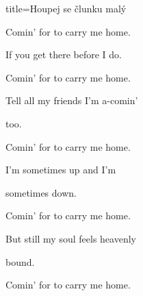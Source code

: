 \begin{song}{title=\predtitle\centering Houpej se člunku malý \\\large \vspace*{-0.3cm}}
\begin{centerjustified}
\begin{varwidth}[t]{0.48\textwidth}
Comin' for to carry me home.




\sloka
If you get there before I do.

Comin' for to carry me home.

Tell all my friends I'm a-comin' 

too.

Comin' for to carry me home.




\sloka
I'm sometimes up and I'm 

sometimes down.

Comin' for to carry me home.

But still my soul feels heavenly 

bound.

Comin' for to carry me home.



\end{varwidth}

\end{centerjustified}
\setcounter{Slokočet}{0}
\end{song}
